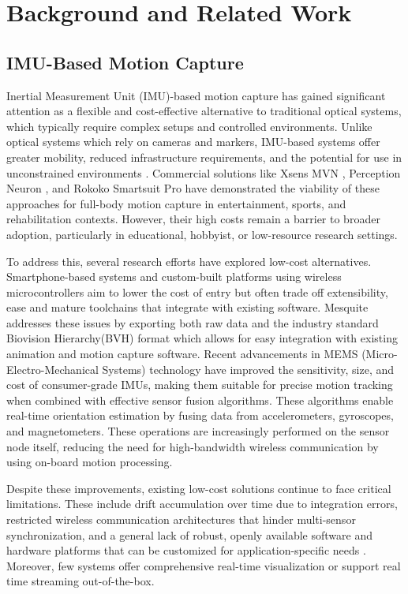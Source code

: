 \documentclass[lettersize,journal]{IEEEtran}
\begin{document}
\section{Background and Related Work}
\subsection{IMU-Based Motion Capture}


Inertial Measurement Unit (IMU)-based motion capture has gained significant attention as a flexible and cost-effective alternative to traditional optical systems, which typically require complex setups and controlled environments. Unlike optical systems which rely on cameras and markers, IMU-based systems offer greater mobility, reduced infrastructure requirements, and the potential for use in unconstrained environments \cite{filippeschi2017}. Commercial solutions like Xsens MVN \cite{roetenberg2019}, Perception Neuron \cite{perception2021}, and Rokoko Smartsuit Pro \cite{rokoko} have demonstrated the viability of these approaches for full-body motion capture in entertainment, sports, and rehabilitation contexts. However, their high costs remain a barrier to broader adoption, particularly in educational, hobbyist, or low-resource research settings.

To address this, several research efforts have explored low-cost alternatives. Smartphone-based systems \cite{gowing2014, chen2018smartphone} and custom-built platforms using wireless microcontrollers \cite{tang2015, liu2020} aim to lower the cost of entry but often trade off extensibility, ease and mature toolchains that integrate with existing software. Mesquite addresses these issues by exporting both raw data and the industry standard Biovision Hierarchy(BVH) format\cite{meredith2001motion} which allows for easy integration with existing animation and motion capture software. Recent advancements in MEMS (Micro-Electro-Mechanical Systems) technology have improved the sensitivity, size, and cost of consumer-grade IMUs, making them suitable for precise motion tracking when combined with effective sensor fusion algorithms\cite{madgwick2011, foxlin2005}. These algorithms enable real-time orientation estimation by fusing data from accelerometers, gyroscopes, and magnetometers. These operations are increasingly performed on the sensor node itself, reducing the need for high-bandwidth wireless communication by using on-board motion processing\cite{roetenberg2019}.

Despite these improvements, existing low-cost solutions continue to face critical limitations. These include drift accumulation over time due to integration errors, restricted wireless communication architectures that hinder multi-sensor synchronization, and a general lack of robust, openly available software and hardware platforms that can be customized for application-specific needs \cite{filippeschi2017, pfeil2016}. Moreover, few systems offer comprehensive real-time visualization or support real time streaming out-of-the-box.
\end{document}
